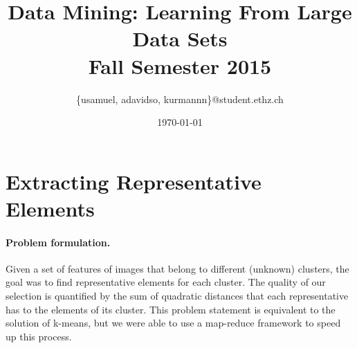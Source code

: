 \documentclass[a4paper, 11pt]{article}
\title{Data Mining: Learning From Large Data Sets\\\vspace{2mm}\Large{Fall Semester 2015}}
\author{\{usamuel, adavidso, kurmannn\}@student.ethz.ch}
\date{\today}
\begin{document}
\maketitle
\thispagestyle{empty}
\pagestyle{empty}

\section*{Extracting Representative Elements} 


\paragraph{Problem formulation.\!\!\!}



Given a set of features of images that belong to different (unknown) clusters, the goal was to find representative elements for each cluster. The quality of our selection is quantified by the sum of quadratic distances that each representative has to the elements of its cluster.
This problem statement is equivalent to the solution of k-means, but we were able to use a map-reduce framework to speed up this process.
\end{document}
